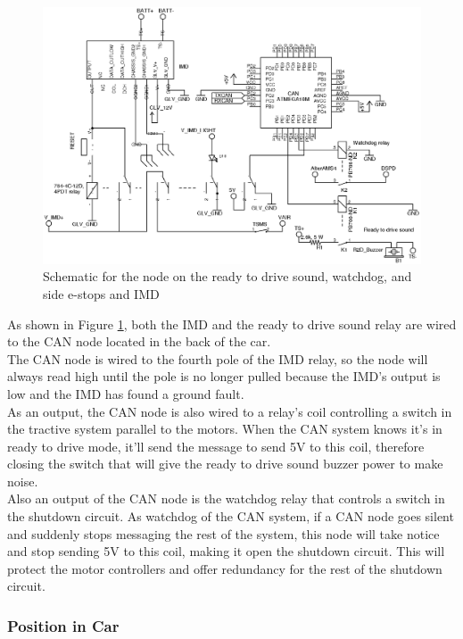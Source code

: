 \documentclass{article}
\begin{document}
            \begin{figure}[H]
            \centering
            \includegraphics[width = 0.8 \textwidth]{IMDandCANschem}
            \caption{Schematic for the node on the ready to drive sound, watchdog, and side e-stops and IMD}
            \label{panelnode}
            \end{figure}

            As shown in Figure \ref{panelnode}, both the IMD and the ready to drive sound relay are wired to the CAN node located in the back of the car.\\

            The CAN node is wired to the fourth pole of the IMD relay, so the node will always read high until the pole is no longer pulled because the IMD's output is low and the IMD has found a ground fault.\\

            As an output, the CAN node is also wired to a relay's coil controlling a switch in the tractive system parallel to the motors. When the CAN system knows it's in ready to drive mode, it'll send the message to send 5V to this coil, therefore closing the switch that will give the ready to drive sound buzzer power to make noise.\\

            Also an output of the CAN node is the watchdog relay that controls a switch in the shutdown circuit. As watchdog of the CAN system, if a CAN node goes silent and suddenly stops messaging the rest of the system, this node will take notice and stop sending 5V to this coil, making it open the shutdown circuit. This will protect the motor controllers and offer redundancy for the rest of the shutdown circuit.

        \subsubsection{Position in Car}
\end{document}
